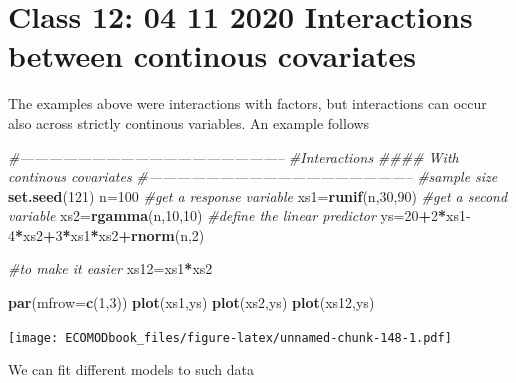 \documentclass[
]{book}
\newenvironment{Shaded}{\begin{snugshade}}{\end{snugshade}}
\newcommand{\CommentTok}[1]{\textcolor[rgb]{0.56,0.35,0.01}{\textit{#1}}}
\newcommand{\DataTypeTok}[1]{\textcolor[rgb]{0.13,0.29,0.53}{#1}}
\newcommand{\DecValTok}[1]{\textcolor[rgb]{0.00,0.00,0.81}{#1}}
\newcommand{\KeywordTok}[1]{\textcolor[rgb]{0.13,0.29,0.53}{\textbf{#1}}}
\newcommand{\NormalTok}[1]{#1}
\newcommand{\OperatorTok}[1]{\textcolor[rgb]{0.81,0.36,0.00}{\textbf{#1}}}
\begin{document}
\hypertarget{aula13}{%
\chapter{Class 12: 04 11 2020 Interactions between continous covariates}\label{aula13}}

The examples above were interactions with factors, but interactions can occur also across strictly continous variables. An example follows

\begin{Shaded}
\begin{Highlighting}[]
\CommentTok{#--------------------------------------------------------}
\CommentTok{#Interactions}
\CommentTok{#### With continous covariates}
\CommentTok{#--------------------------------------------------------}
\CommentTok{#sample size}
\KeywordTok{set.seed}\NormalTok{(}\DecValTok{121}\NormalTok{)}
\NormalTok{n=}\DecValTok{100}
\CommentTok{#get a response variable}
\NormalTok{xs1=}\KeywordTok{runif}\NormalTok{(n,}\DecValTok{30}\NormalTok{,}\DecValTok{90}\NormalTok{)}
\CommentTok{#get a second variable}
\NormalTok{xs2=}\KeywordTok{rgamma}\NormalTok{(n,}\DecValTok{10}\NormalTok{,}\DecValTok{10}\NormalTok{)}
\CommentTok{#define the linear predictor}
\NormalTok{ys=}\DecValTok{20}\OperatorTok{+}\DecValTok{2}\OperatorTok{*}\NormalTok{xs1}\DecValTok{-4}\OperatorTok{*}\NormalTok{xs2}\OperatorTok{+}\DecValTok{3}\OperatorTok{*}\NormalTok{xs1}\OperatorTok{*}\NormalTok{xs2}\OperatorTok{+}\KeywordTok{rnorm}\NormalTok{(n,}\DecValTok{2}\NormalTok{)}

\CommentTok{#to make it easier}
\NormalTok{xs12=xs1}\OperatorTok{*}\NormalTok{xs2}

\KeywordTok{par}\NormalTok{(}\DataTypeTok{mfrow=}\KeywordTok{c}\NormalTok{(}\DecValTok{1}\NormalTok{,}\DecValTok{3}\NormalTok{))}
\KeywordTok{plot}\NormalTok{(xs1,ys)}
\KeywordTok{plot}\NormalTok{(xs2,ys)}
\KeywordTok{plot}\NormalTok{(xs12,ys)}
\end{Highlighting}
\end{Shaded}

\texttt{[image: ECOMODbook\_files/figure-latex/unnamed-chunk-148-1.pdf]}

We can fit different models to such data
\end{document}
